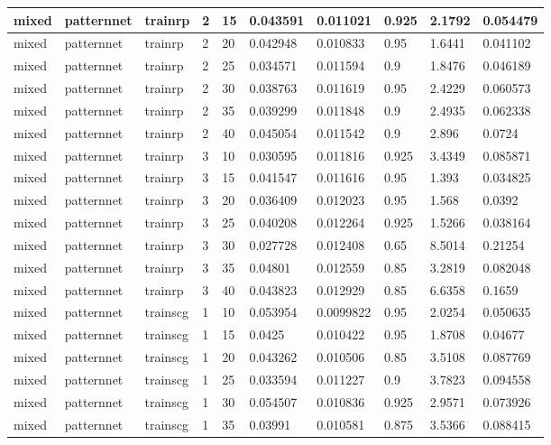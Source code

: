 \begin{longtable}{lllllllll}
mixed & patternnet & trainrp & 2 & 15 & 0.043591 & 0.011021 & 0.925 & 2.1792 & 0.054479 \\ \hline 
mixed & patternnet & trainrp & 2 & 20 & 0.042948 & 0.010833 & 0.95 & 1.6441 & 0.041102 \\ \hline 
mixed & patternnet & trainrp & 2 & 25 & 0.034571 & 0.011594 & 0.9 & 1.8476 & 0.046189 \\ \hline 
mixed & patternnet & trainrp & 2 & 30 & 0.038763 & 0.011619 & 0.95 & 2.4229 & 0.060573 \\ \hline 
mixed & patternnet & trainrp & 2 & 35 & 0.039299 & 0.011848 & 0.9 & 2.4935 & 0.062338 \\ \hline 
mixed & patternnet & trainrp & 2 & 40 & 0.045054 & 0.011542 & 0.9 & 2.896 & 0.0724 \\ \hline 
mixed & patternnet & trainrp & 3 & 10 & 0.030595 & 0.011816 & 0.925 & 3.4349 & 0.085871 \\ \hline 
mixed & patternnet & trainrp & 3 & 15 & 0.041547 & 0.011616 & 0.95 & 1.393 & 0.034825 \\ \hline 
mixed & patternnet & trainrp & 3 & 20 & 0.036409 & 0.012023 & 0.95 & 1.568 & 0.0392 \\ \hline 
mixed & patternnet & trainrp & 3 & 25 & 0.040208 & 0.012264 & 0.925 & 1.5266 & 0.038164 \\ \hline 
mixed & patternnet & trainrp & 3 & 30 & 0.027728 & 0.012408 & 0.65 & 8.5014 & 0.21254 \\ \hline 
mixed & patternnet & trainrp & 3 & 35 & 0.04801 & 0.012559 & 0.85 & 3.2819 & 0.082048 \\ \hline 
mixed & patternnet & trainrp & 3 & 40 & 0.043823 & 0.012929 & 0.85 & 6.6358 & 0.1659 \\ \hline 
mixed & patternnet & trainscg & 1 & 10 & 0.053954 & 0.0099822 & 0.95 & 2.0254 & 0.050635 \\ \hline 
mixed & patternnet & trainscg & 1 & 15 & 0.0425 & 0.010422 & 0.95 & 1.8708 & 0.04677 \\ \hline 
mixed & patternnet & trainscg & 1 & 20 & 0.043262 & 0.010506 & 0.85 & 3.5108 & 0.087769 \\ \hline 
mixed & patternnet & trainscg & 1 & 25 & 0.033594 & 0.011227 & 0.9 & 3.7823 & 0.094558 \\ \hline 
mixed & patternnet & trainscg & 1 & 30 & 0.054507 & 0.010836 & 0.925 & 2.9571 & 0.073926 \\ \hline 
mixed & patternnet & trainscg & 1 & 35 & 0.03991 & 0.010581 & 0.875 & 3.5366 & 0.088415 \\ \hline 

\end{longtable}
